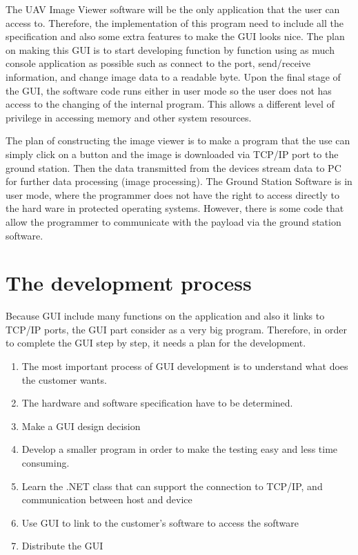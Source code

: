\label{chap:implementation_ground_station}

The UAV Image Viewer software will be the only application that the user can access to. 
Therefore, the implementation of this program need to include all the specification and also some extra features to make the GUI looks nice.
The plan on making this GUI is to start developing function by function using as much console application as possible such as connect to the port, send/receive information, and change image data to a readable byte.
Upon the final stage of the GUI, the software code runs either in user mode so the user does not has access to the changing of the internal program\cite{tsuiK}. 
This allows a different level of privilege in accessing memory and other system resources. 

The plan of constructing the image viewer is to make a program that the use can simply click on a button and the image is downloaded via TCP/IP port to the ground station.
Then the data transmitted from the devices stream data to PC for further data processing (image processing).  
The Ground Station Software is in user mode, where the programmer does not have the right to access directly to the hard ware in protected operating systems. 
However, there is some code that allow the programmer to communicate with the payload via the ground station software.

\section{The development process} 
Because GUI include many functions on the application and also it links to TCP/IP ports, the GUI part consider as a very big program. 
Therefore, in order to complete the GUI step by step, it needs a plan for the development.
\flushleft
\begin{enumerate}


\item	The most important process of GUI development is to understand what does the customer wants. 

\item	The hardware and software specification have to be determined.
 
\item	Make a GUI design decision

\item Develop a smaller program in order to make the testing easy and less time consuming. 

\item	Learn the .NET class that can support the connection to TCP/IP, and communication between host and device

\item	Use GUI to link to the customer’s software to access the software

\item	Distribute the GUI
\end{enumerate}

